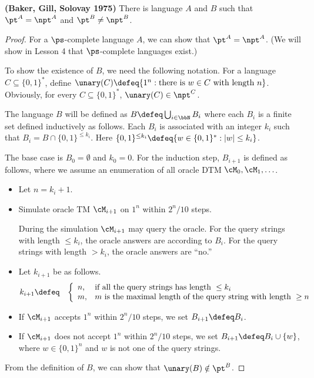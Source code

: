 \documentclass[11pt, a4paper]{article}
\begin{document}
\begin{theorem}
\label{theo:TM-oracle}
{\bf (Baker, Gill, Solovay 1975)}
There is language $A$ and $B$ such that $\pt^A=\npt^A$ and $\pt^B\neq \npt^B$. 
\end{theorem}
\begin{proof}
For a $\ps$-complete language $A$,
we can show that $\pt^A = \npt^A$.
(We will show in Lesson 4 that $\ps$-complete languages exist.)

To show the existence of $B$,
we need the following notation.
For a language $C\subseteq \{0,1\}^*$, define $\unary(C) \defeq \{1^n : \text{there is}\ w \in C \ \text{with length}\ n\}$.
Obviously, for every $C\subseteq \{0,1\}^*$, $\unary(C)\in \npt^C$.

The language $B$ will be defined as $B\defeq\bigcup_{i\in \bbN}B_i$ 
where each $B_i$ is a finite set defined inductively as follows.
Each $B_i$ is associated with an integer $k_i$ such that $B_i = B \cap \{0,1\}^{\leq k_i}$.
Here $\{0,1\}^{\leq k_i}\defeq\{w \in \{0,1\}^* : |w|\leq k_i\}$.

The base case is $B_0=\emptyset$ and $k_0=0$.
For the induction step, $B_{i+1}$ is defined as follows,
where we assume an enumeration of all oracle DTM $\cM_0,\cM_1,\ldots$.
\begin{itemize}\itemsep=0pt
\item 
Let $n = k_i+1$.
\item
Simulate oracle TM $\cM_{i+1}$ on $1^n$ within $2^n/10$ steps.

During the simulation $\cM_{i+1}$ may query the oracle.
For the query strings with length $\leq k_i$, 
the oracle answers are according to $B_i$.
For the query strings with length $> k_i$, the oracle answers are ``no.''  
\item
Let $k_{i+1}$ be as follows.
\begin{eqnarray*}
k_{i+1} & \defeq & 
\left\{
\begin{array}{ll}
n, & \text{if all the query strings has length}\ \leq k_i
\\
m, & m \ \text{is the maximal length of the query string with length} \ \geq n
\end{array}
\right.
\end{eqnarray*}
\item
If $\cM_{i+1}$ accepts $1^n$ within $2^n/10$ steps,
we set $B_{i+1}\defeq B_i$.
\item
If $\cM_{i+1}$ does not accept $1^n$ within $2^n/10$ steps,
we set $B_{i+1}\defeq B_i \cup \{w\}$, where $w\in \{0,1\}^n$ and $w$ is not one of the query strings.
\end{itemize}
From the definition of $B$, 
we can show that $\unary(B)\notin \pt^B$.
\end{proof}
\end{document}
